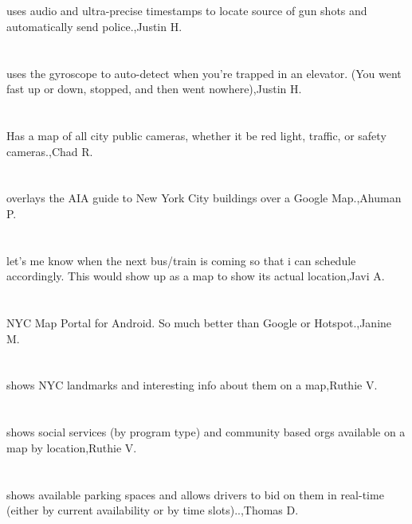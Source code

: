 \section{}uses audio and ultra-precise timestamps to locate source of gun shots and automatically send police.,Justin H.
\section{}uses the gyroscope to auto-detect when you're trapped in an elevator. (You went fast up or down, stopped, and then went nowhere),Justin H.
\section{}Has a map of all city public cameras, whether it be red light, traffic, or safety cameras.,Chad R.
\section{} overlays the AIA guide to New York City buildings over a Google Map.,Ahuman P.
\section{}let's me know when the next bus/train is  coming so that i can schedule accordingly. This would show up as a map to show its actual location,Javi A.
\section{}NYC Map Portal for Android. So much better than Google or Hotspot.,Janine M.
\section{}shows NYC landmarks and interesting info about them on a map,Ruthie V.
\section{}shows social services (by program type) and community based orgs available on a map by location,Ruthie V.
\section{}shows available parking spaces and allows drivers to bid on them in real-time (either by current availability or by time slots)..,Thomas D.
